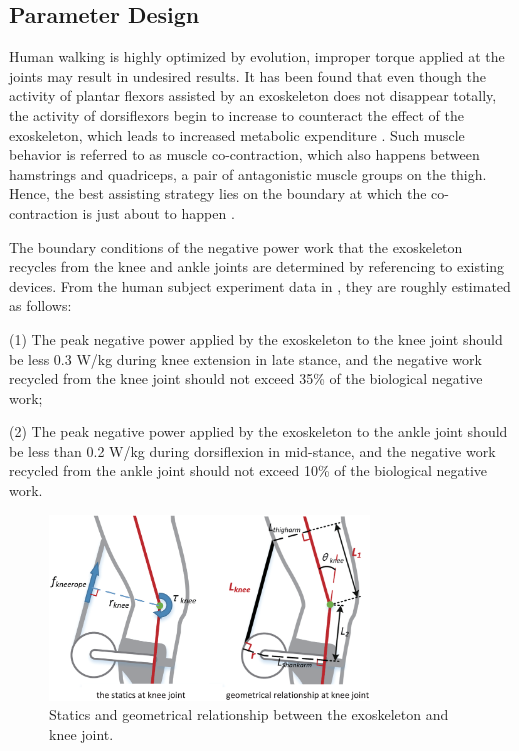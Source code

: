 \documentclass[twocolumn,cleanfoot,10pt]{asme2ej}
\begin{document}
\subsection{Parameter Design}

\label{sec:parameter design}

Human walking is highly optimized by evolution, improper torque applied at the joints may result in undesired results.
It has been found that even though the activity of plantar flexors assisted by an exoskeleton does not disappear totally, the activity of dorsiflexors begin to increase to counteract the effect of the exoskeleton, which leads to increased metabolic expenditure \cite{RN4}.
Such muscle behavior is referred to as muscle co-contraction, which also happens between hamstrings and quadriceps, a pair of antagonistic muscle groups on the thigh.
Hence, the best assisting strategy lies on the boundary at which the co-contraction is just about to happen \cite{RN22}. 

The boundary conditions of the negative power work that the exoskeleton recycles from the knee and ankle joints are determined by referencing to existing devices.
From the human subject experiment data in \cite{RN5,RN18}, they are roughly estimated as follows:

(1) The peak negative power applied by the exoskeleton to the knee joint should be less 0.3 W/kg during knee extension in late stance, and the negative work recycled from the knee joint should not exceed 35\% of the biological negative work;

(2) The peak negative power applied by the exoskeleton to the ankle joint should be less than 0.2 W/kg during dorsiflexion in mid-stance, and the negative work recycled from the ankle joint should not exceed 10\% of the biological negative work.

\begin{figure}[t]
	\centering
	\includegraphics[width=8.5cm]{kneeparameters.eps}
	\caption{Statics and geometrical relationship between the exoskeleton and knee joint.}
	\label{fig:kneeparameters}
\end{figure}
\end{document}
